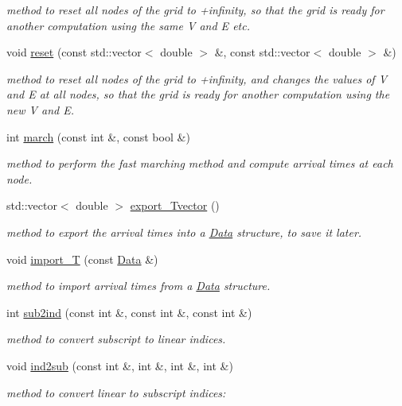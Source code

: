 \begin{DoxyCompactItemize}
\begin{DoxyCompactList}\small\item\em method to reset all nodes of the grid to +infinity, so that the grid is ready for another computation using the same V and E etc. \end{DoxyCompactList}\item 
\hypertarget{class_grid_acf7695627b9a8573fa614ade7d7720ef}{}void \hyperlink{class_grid_acf7695627b9a8573fa614ade7d7720ef}{reset} (const std\+::vector$<$ double $>$ \&, const std\+::vector$<$ double $>$ \&)\label{class_grid_acf7695627b9a8573fa614ade7d7720ef}

\begin{DoxyCompactList}\small\item\em method to reset all nodes of the grid to +infinity, and changes the values of V and E at all nodes, so that the grid is ready for another computation using the new V and E. \end{DoxyCompactList}\item 
int \hyperlink{class_grid_a36ab376fb6fa2ef97b52b02e93619676}{march} (const int \&, const bool \&)
\begin{DoxyCompactList}\small\item\em method to perform the fast marching method and compute arrival times at each node. \end{DoxyCompactList}\item 
std\+::vector$<$ double $>$ \hyperlink{class_grid_a67e192bc08a5483b9f503fb1a46d7cd8}{export\+\_\+\+Tvector} ()
\begin{DoxyCompactList}\small\item\em method to export the arrival times into a \hyperlink{class_data}{Data} structure, to save it later. \end{DoxyCompactList}\item 
void \hyperlink{class_grid_a91177a96caba01154349f06348e1f680}{import\+\_\+\+T} (const \hyperlink{class_data}{Data} \&)
\begin{DoxyCompactList}\small\item\em method to import arrival times from a \hyperlink{class_data}{Data} structure. \end{DoxyCompactList}\item 
int \hyperlink{class_grid_a82b0fe20398c55fd1643e0fbea912ac7}{sub2ind} (const int \&, const int \&, const int \&)
\begin{DoxyCompactList}\small\item\em method to convert subscript to linear indices. \end{DoxyCompactList}\item 
void \hyperlink{class_grid_a719cd86ef4cafeb3fe257c1c50bc63d7}{ind2sub} (const int \&, int \&, int \&, int \&)
\begin{DoxyCompactList}\small\item\em method to convert linear to subscript indices\+: \end{DoxyCompactList}\end{DoxyCompactItemize}
